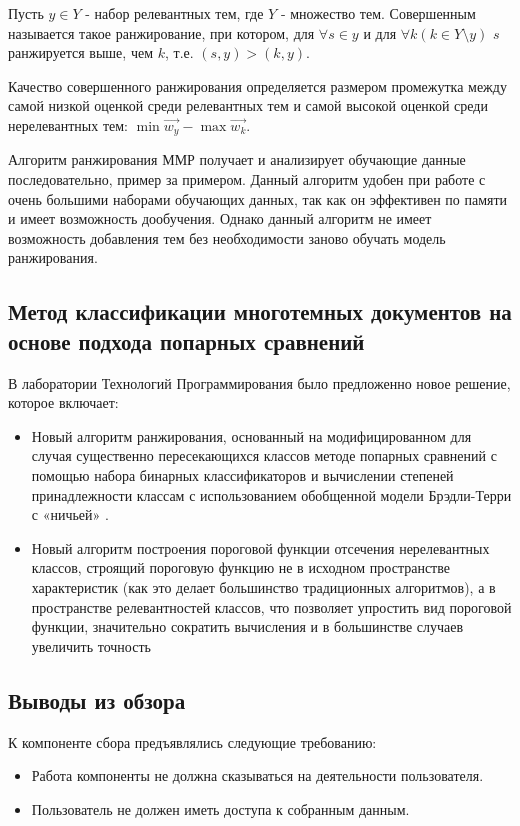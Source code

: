 \documentclass[russian, utf8, emptystyle]{eskdtext}
\begin{document}
Пусть $y \in Y$ - набор релевантных тем, где $Y$ - множество тем. Совершенным называется такое ранжирование, при котором, для $\forall s \in y$ и для $\forall k (k \in Y\setminus y)$ $s$ ранжируется выше, чем $k$, т.е. $(s,y)>(k,y)$.

Качество совершенного ранжирования определяется размером промежутка между самой низкой оценкой среди релевантных тем и самой высокой оценкой среди нерелевантных тем: $\min{\vec{w_y}}-\max{\vec{w_k}}$.

Алгоритм ранжирования ММР получает и анализирует обучающие данные последовательно, пример за примером. Данный алгоритм удобен при работе с очень большими наборами обучающих данных, так как он эффективен по памяти и имеет возможность дообучения. Однако данный алгоритм не имеет возможность добавления тем без необходимости заново обучать модель ранжирования.

\subsection{Метод классификации многотемных документов на основе подхода попарных сравнений}

В лаборатории Технологий Программирования было предложенно новое решение, которое включает:

\begin{itemize}
	\item Новый алгоритм ранжирования, основанный на модифицированном для случая существенно пересекающихся классов методе попарных сравнений с помощью набора бинарных классификаторов и вычислении степеней принадлежности классам  с использованием обобщенной модели Брэдли-Терри с «ничьей» \cite{bredli}.
	\item Новый алгоритм построения пороговой функции отсечения нерелевантных классов, строящий пороговую функцию не в исходном пространстве характеристик (как это делает большинство традиционных алгоритмов), а в пространстве релевантностей классов, что позволяет упростить вид пороговой функции, значительно сократить вычисления и в большинстве случаев увеличить точность
\end{itemize}


\subsection {Выводы из обзора}

К компоненте сбора предъявлялись следующие требованию:

\begin{itemize}
	\item Работа компоненты не должна сказываться на деятельности пользователя.
	\item Пользователь не должен иметь доступа к собранным данным.
\end{itemize}
\end{document}
